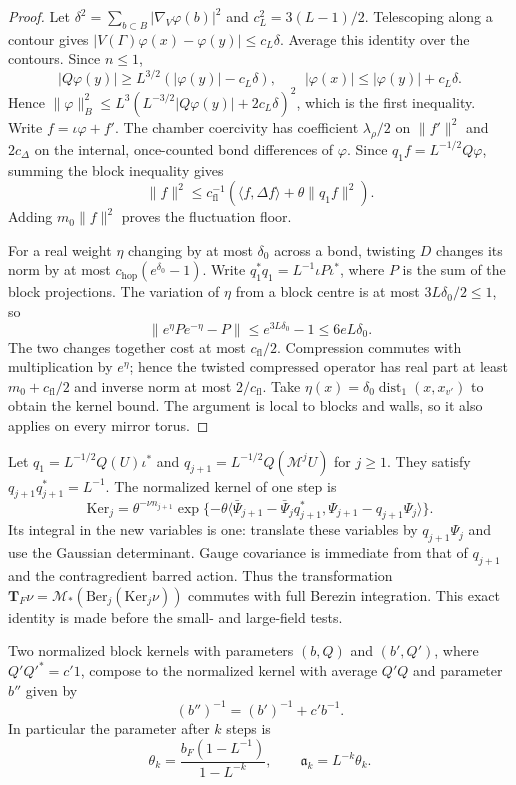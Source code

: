 \documentclass[11pt,letterpaper,reqno]{amsart}
\makeatletter
\theoremstyle{definition}
\newcommand{\ms@minorstart}{%
  \pushQED{\qed}\renewcommand{\qedsymbol}{$\blacksquare$}}
\newenvironment{lemma}[1][]{\ms@minorstart\ms@lemma[#1]}
  {\popQED\endms@lemma}
\theoremstyle{remark}
\makeatother
\begin{document}
\begin{proof}
Let $\delta^2=\sum_{b\subset B}|\nabla_V\varphi(b)|^2$ and
$c_L^2=3(L-1)/2$.  Telescoping along a contour gives
$|V(\Gamma)\varphi(x)-\varphi(y)|\le c_L\delta$.
Average this identity over the contours.  Since $n\le1$,
\[
 |Q\varphi(y)|\ge L^{3/2}(|\varphi(y)|-c_L\delta),\qquad
 |\varphi(x)|\le|\varphi(y)|+c_L\delta.
\]
Hence
$\|\varphi\|_B^2\le
L^3(L^{-3/2}|Q\varphi(y)|+2c_L\delta)^2$,
which is the first inequality.  Write $f=\iota\varphi+f'$.
The chamber coercivity has coefficient $\lambda_\rho/2$ on
$\|f'\|^2$ and $2c_\Delta$ on the internal, once-counted bond
differences of $\varphi$. Since $q_1f=L^{-1/2}Q\varphi$,
summing the block inequality gives
\[
 \|f\|^2\le c_{\mathrm{fl}}^{-1}
          (\langle f,\Delta f\rangle+\theta\|q_1f\|^2).
\]
Adding $m_0\|f\|^2$ proves the fluctuation floor.

For a real weight $\eta$ changing by at most $\delta_0$ across
a bond, twisting $D$ changes its norm by at most
$c_{\mathrm{hop}}(e^{\delta_0}-1)$. Write
$q_1^*q_1=L^{-1}\iota P\iota^*$, where $P$ is the sum of
the block projections. The variation of $\eta$ from a block
centre is at most $3L\delta_0/2\le1$, so
\[
 \|e^\eta Pe^{-\eta}-P\|\le e^{3L\delta_0}-1
                         \le6eL\delta_0.
\]
The two changes together cost at most $c_{\mathrm{fl}}/2$.
Compression commutes with multiplication by $e^\eta$; hence
the twisted compressed operator has real part at least
$m_0+c_{\mathrm{fl}}/2$ and inverse norm at most
$2/c_{\mathrm{fl}}$. Take
$\eta(x)=\delta_0\operatorname{dist}_1(x,x_{v'})$ to obtain
the kernel bound. The argument is local to blocks and walls,
so it also applies on every mirror torus.
\end{proof}

Let $q_1=L^{-1/2}Q(U)\iota^*$ and
$q_{j+1}=L^{-1/2}Q(\mathcal M^jU)$ for $j\ge1$.
They satisfy $q_{j+1}q_{j+1}^*=L^{-1}$.
The normalized kernel of one step is
\[
 \mathrm{Ker}_j=\theta^{-\nu n_{j+1}}
 \exp\{-\theta\langle\bar\Psi_{j+1}-\bar\Psi_jq_{j+1}^*,
                         \Psi_{j+1}-q_{j+1}\Psi_j\rangle\}.
\]
Its integral in the new variables is one: translate these variables
by $q_{j+1}\Psi_j$ and use the Gaussian determinant.  Gauge covariance
is immediate from that of $q_{j+1}$ and the contragredient barred
action.  Thus the transformation
$\mathbf T_F\nu=\mathcal M_*(\mathrm{Ber}_j(\mathrm{Ker}_j\nu))$
commutes with full Berezin integration.  This exact identity is made
before the small- and large-field tests.

\begin{lemma}[Composition of Gaussian block kernels]\label{C-387-30}
Two normalized block kernels with parameters $(b,Q)$ and $(b',Q')$,
where $Q'Q'^*=c'1$, compose to the normalized kernel with average
$Q'Q$ and parameter $b''$ given by
\[
 (b'')^{-1}=(b')^{-1}+c'b^{-1}.
\]
In particular the parameter after $k$ steps is
\[
 \theta_k=\frac{b_F(1-L^{-1})}{1-L^{-k}},\qquad
 \mathfrak a_k=L^{-k}\theta_k.
\]
\end{lemma}
\end{document}
